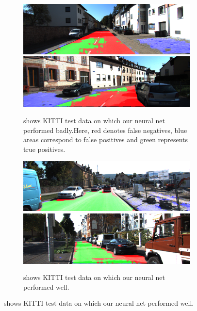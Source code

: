 \begin{figure}[h!]
 \centering
    \begin{subfigure}{\textwidth}
 
     \includegraphics[scale=0.2]{figures/kitty_eval/Persp_um_road_000077.png}
    \includegraphics[scale=0.2]{figures/kitty_eval/Persp_um_road_000095.png}
  \label{fig:sfig1}
      \caption{shows KITTI test data on which our neural net performed badly.Here, red denotes false negatives, blue areas correspond to false positives and green represents true positives.}
\end{subfigure}
\centering
\begin{subfigure}{\textwidth}  
    \includegraphics[scale=0.2]{figures/kitty_eval/Persp_uu_road_000027.png}
	\includegraphics[scale=0.2]{figures/kitty_eval/Persp_uu_road_000082.png}
    \caption{shows KITTI test data on which our neural net performed well.}
  \label{fig:sfig2}
\end{subfigure}
\end{figure}












%
